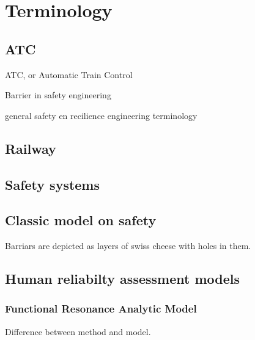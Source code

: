 


\chapter{Terminology}
\section{ATC}
ATC, or Automatic Train Control

Barrier in safety engineering

general safety en recilience engineering terminology

\section{Railway}

\section{Safety systems}

\section{Classic model on safety}
Barriars are depicted as layers of swiss cheese with holes in them. 


\section{Human reliabilty assessment models}



\subsection{Functional Resonance Analytic Model}

Difference between method and model.